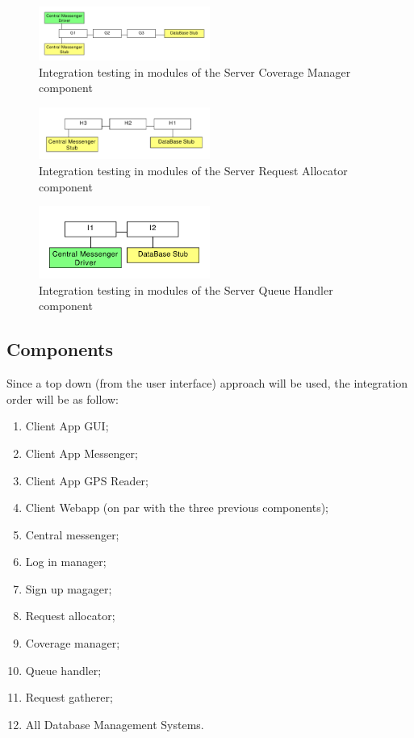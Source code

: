 \begin{figure}
\centering
\includegraphics[width=0.5\textwidth]{tex-images/mod-7}
\caption{Integration testing in modules of the Server Coverage Manager component}
\end{figure}

\begin{figure}
\centering
\includegraphics[width=0.5\textwidth]{tex-images/mod-8}
\caption{Integration testing in modules of the Server Request Allocator component}
\end{figure}

\begin{figure}
\centering
\includegraphics[width=0.5\textwidth]{tex-images/mod-9}
\caption{Integration testing in modules of the Server Queue Handler component}
\end{figure}

\clearpage
\subsection{Components}
Since a top down (from the user interface) approach will be used, the integration order will be as follow:
\begin{enumerate}
\item Client App GUI;
\item Client App Messenger;
\item Client App GPS Reader;
\item Client Webapp (on par with the three previous components);
\item Central messenger;
\item Log in manager;
\item Sign up magager;
\item Request allocator;
\item Coverage manager;
\item Queue handler;
\item Request gatherer;
\item All Database Management Systems.
\end{enumerate}


